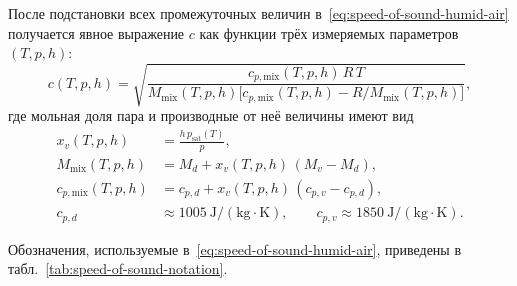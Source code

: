 После подстановки всех промежуточных величин в~\eqref{eq:speed-of-sound-humid-air} получается явное
выражение $c$ как функции трёх измеряемых параметров $(T, p, h)$:
\begin{equation}\label{eq:speed-of-sound-explicit}
  c(T,p,h) = \sqrt{\frac{c_{p,\mathrm{mix}}(T,p,h)\,R\,T}
                        {M_{\mathrm{mix}}(T,p,h)\bigl[c_{p,\mathrm{mix}}(T,p,h) - R/M_{\mathrm{mix}}(T,p,h)\bigr]}},
\end{equation}
где мольная доля пара и производные от неё величины имеют вид
\begin{align*}
  x_v(T,p,h)            &= \frac{h\,p_{\mathrm{sat}}(T)}{p}, \\
  M_{\mathrm{mix}}(T,p,h) &= M_d + x_v(T,p,h)\,(M_v - M_d), \\
  c_{p,\mathrm{mix}}(T,p,h) &= c_{p,d} + x_v(T,p,h)\,(c_{p,v} - c_{p,d}), \\
  c_{p,d} &\approx 1005~\mathrm{J/(kg\cdot K)},\qquad
  c_{p,v} \approx 1850~\mathrm{J/(kg\cdot K)}.
\end{align*}

Обозначения, используемые в~\eqref{eq:speed-of-sound-humid-air}, приведены в табл.~\ref{tab:speed-of-sound-notation}.

